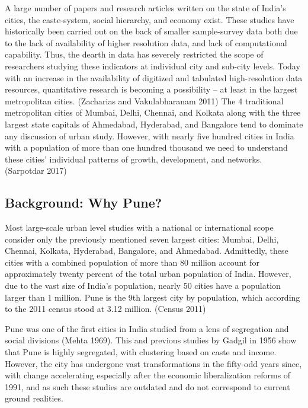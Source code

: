 \documentclass[
]{article}
\begin{document}
A large number of papers and research articles written on the state of
India's cities, the caste-system, social hierarchy, and economy exist.
These studies have historically been carried out on the back of smaller
sample-survey data both due to the lack of availability of higher
resolution data, and lack of computational capability. Thus, the dearth
in data has severely restricted the scope of researchers studying these
indicators at individual city and sub-city levels. Today with an
increase in the availability of digitized and tabulated high-resolution
data resources, quantitative research is becoming a possibility -- at
least in the largest metropolitan cities. (Zacharias and Vakulabharanam
2011) The 4 traditional metropolitan cities of Mumbai, Delhi, Chennai,
and Kolkata along with the three largest state capitals of Ahmedabad,
Hyderabad, and Bangalore tend to dominate any discussion of urban study.
However, with nearly five hundred cities in India with a population of
more than one hundred thousand we need to understand these cities'
individual patterns of growth, development, and networks. (Sarpotdar
2017)

\hypertarget{background-why-pune}{%
\subsection{Background: Why Pune?}\label{background-why-pune}}

Most large-scale urban level studies with a national or international
scope consider only the previously mentioned seven largest cities:
Mumbai, Delhi, Chennai, Kolkata, Hyderabad, Bangalore, and Ahmedabad.
Admittedly, these cities with a combined population of more than 80
million account for approximately twenty percent of the total urban
population of India. However, due to the vast size of India's
population, nearly 50 cities have a population larger than 1 million.
Pune is the 9th largest city by population, which according to the 2011
census stood at 3.12 million. (Census 2011)

Pune was one of the first cities in India studied from a lens of
segregation and social divisions (Mehta 1969). This and previous studies
by Gadgil in 1956 show that Pune is highly segregated, with clustering
based on caste and income. However, the city has undergone vast
transformations in the fifty-odd years since, with change accelerating
especially after the economic liberalization reforms of 1991, and as
such these studies are outdated and do not correspond to current ground
realities.
\end{document}
